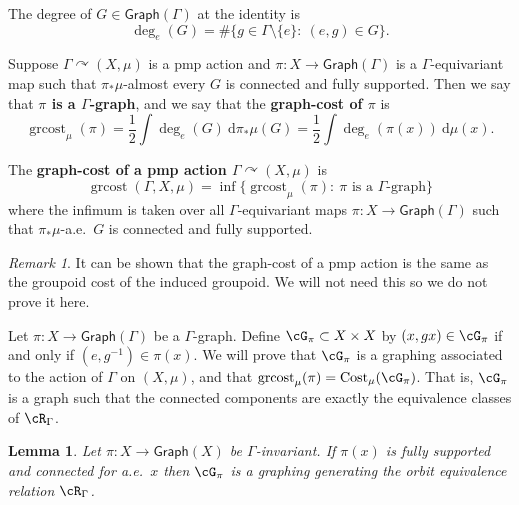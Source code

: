 \documentclass[12pt]{article}
\theoremstyle{plain}
\newtheorem{lem}[thm]{Lemma}
\theoremstyle{definition}
\theoremstyle{remark}
\newtheorem{remark}{Remark}
\newcommand{\G}{\Gamma}
\newcommand\cost{{\operatorname{Cost}}}
\def\cc{{\curvearrowright}}
\newcommand{\dee}{\textrm{d}}
\begin{document}
The degree of $G \in \mathsf{Graph}(\G)$ at the identity is 
$$\deg_e(G) = \#\{g\in \G \setminus \{e\}:~ (e,g)\in G\}.$$

Suppose $\G \cc (X,\mu)$ is a pmp action and  $\pi: X \to \mathsf{Graph}(\G)$ is a $\G$-equivariant map such that $\pi_* \mu$-almost every $G$ is connected and fully supported. Then we say that \textbf{$\pi$ is a $\G$-graph}, and we say that the \textbf{graph-cost of $\pi$} is
\[ \operatorname{grcost}_\mu(\pi) = \frac{1}{2} \int \deg_e(G)~\dee \pi_*\mu(G) = \frac{1}{2}\int \deg_e(\pi(x))~\dee \mu(x). \]


The \textbf{graph-cost of a pmp action $\G \cc (X,\mu)$} is 
$$ \operatorname{grcost}(\G,X,\mu) = \inf\{\operatorname{grcost}_\mu(\pi) :~ \pi \text{ is a $\G$-graph}\}$$
where the infimum is taken over all $\G$-equivariant maps $\pi:X \to \mathsf{Graph}(\G)$ such that $\pi_*\mu$-a.e.\ $G$ is connected and fully supported.

\begin{remark}
    It can be shown that the graph-cost of a pmp action is the same as the groupoid cost of the induced groupoid. We will not need this so we do not prove it here.
\end{remark}


Let $\pi: X \to \mathsf{Graph}(\G)$ be a $\G$-graph. Define $\cG_\pi \subset X\times X$ by $(x,g x) \in \cG_\pi$ if and only if $(e,g^{-1})\in \pi(x)$. We will prove that $\cG_\pi$ is a graphing associated to the action of $\G$ on $(X,\mu)$, and that $\operatorname{grcost}_\mu(\pi)=\cost_\mu(\cG_\pi)$. That is, $\cG_\pi$ is a graph such that the connected components are exactly the equivalence classes of $\cR_\G$.



\begin{lem}
  Let $\pi: X \to \mathsf{Graph}(X)$ be $\G$-invariant. If $\pi(x)$ is fully supported and connected for a.e.\ $x$ then  $\cG_\pi$ is a graphing generating the orbit equivalence relation $\cR_\G$. 
\end{lem}
\end{document}
